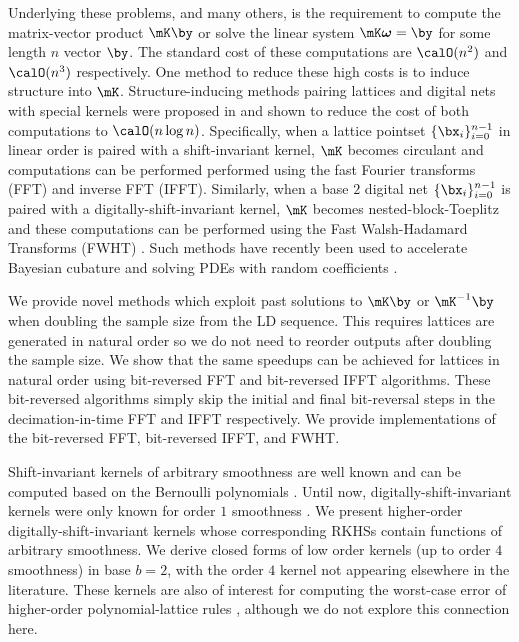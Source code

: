 \documentclass[acmsmall]{acmart}
\begin{document}
Underlying these problems, and many others, is the requirement to compute the matrix-vector product $\mK \by$ or solve the linear system $\mK \boldsymbol{\omega} =\by$ for some length $n$ vector $\by$. The standard cost of these computations are $\calO(n^2)$ and $\calO(n^3)$ respectively. One method to reduce these high costs is to induce structure into $\mK$. Structure-inducing methods pairing lattices and digital nets with special kernels were proposed in \citep{zeng.spline_lattice_digital_net} and shown to reduce the cost of both computations to $\calO(n \log n)$. Specifically, when a lattice pointset $\{\bx_i\}_{i=0}^{n-1}$ in linear order is paired with a shift-invariant kernel, $\mK$ becomes circulant and computations can be performed performed using the fast Fourier transforms (FFT) and inverse FFT (IFFT). Similarly, when a base $2$ digital net $\{\bx_i\}_{i=0}^{n-1}$ is paired with a digitally-shift-invariant kernel, $\mK$ becomes nested-block-Toeplitz and these computations can be performed using the Fast Walsh-Hadamard Transforms (FWHT) \citep{fino.fwht}. Such methods have recently been used to accelerate Bayesian cubature \citep{rathinavel.bayesian_QMC_lattice,rathinavel.bayesian_QMC_sobol,rathinavel.bayesian_QMC_thesis} and solving PDEs with random coefficients \citep{kaarnioja.kernel_interpolants_lattice_rkhs,kaarnioja.kernel_interpolants_lattice_rkhs_serendipitous}.

We provide novel methods which exploit past solutions to $\mK\by$ or $\mK^{-1}\by$ when doubling the sample size from the LD sequence. This requires lattices are generated in natural order so we do not need to reorder outputs after doubling the sample size. We show that the same speedups can be achieved for lattices in natural order using bit-reversed FFT and bit-reversed IFFT algorithms. These bit-reversed algorithms simply skip the initial and final bit-reversal steps in the decimation-in-time FFT and IFFT respectively. We provide implementations of the bit-reversed FFT, bit-reversed IFFT, and FWHT. 

Shift-invariant kernels of arbitrary smoothness are well known and can be computed based on the Bernoulli polynomials \citep{kaarnioja.kernel_interpolants_lattice_rkhs,kaarnioja.kernel_interpolants_lattice_rkhs_serendipitous,cools2021fast,cools2020lattice,sloan2001tractability,kuo2004lattice}. Until now, digitally-shift-invariant kernels were only known for order $1$ smoothness \citep{dick.multivariate_integraion_sobolev_spaces_digital_nets}. We present higher-order digitally-shift-invariant kernels whose corresponding RKHSs contain functions of arbitrary smoothness. We derive closed forms of low order kernels (up to order $4$ smoothness) in base $b=2$, with the order $4$ kernel not appearing elsewhere in the literature. These kernels are also of interest for computing the worst-case error of higher-order polynomial-lattice rules \cite{baldeaux.polylat_efficient_comp_worse_case_error_cbc}, although we do not explore this connection here. 
\end{document}
